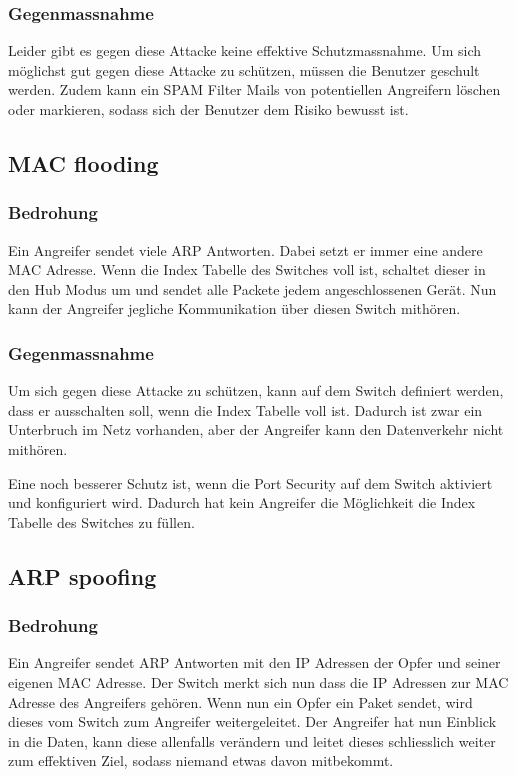 \documentclass[11pt,a4paper,parskip=half]{scrartcl}
\begin{document}
\subsubsection{Gegenmassnahme}
Leider gibt es gegen diese Attacke keine effektive Schutzmassnahme. Um sich möglichst gut gegen diese Attacke zu schützen, müssen die Benutzer geschult werden. Zudem kann ein SPAM Filter Mails von potentiellen Angreifern löschen oder markieren, sodass sich der Benutzer dem Risiko bewusst ist.

\subsection{MAC flooding}
\subsubsection{Bedrohung}
Ein Angreifer sendet viele ARP Antworten. Dabei setzt er immer eine andere MAC Adresse. Wenn die Index Tabelle des Switches voll ist, schaltet dieser in den Hub Modus um und sendet alle Packete jedem angeschlossenen Gerät. Nun kann der Angreifer jegliche Kommunikation über diesen Switch mithören. 
\subsubsection{Gegenmassnahme}
Um sich gegen diese Attacke zu schützen, kann auf dem Switch definiert werden, dass er ausschalten soll, wenn die Index Tabelle voll ist. Dadurch ist zwar ein Unterbruch im Netz vorhanden, aber der Angreifer kann den Datenverkehr nicht mithören.

Eine noch besserer Schutz ist, wenn die Port Security auf dem Switch aktiviert und konfiguriert wird. Dadurch hat kein Angreifer die Möglichkeit die Index Tabelle des Switches zu füllen.

\subsection{ARP spoofing}
\subsubsection{Bedrohung}
Ein Angreifer sendet ARP Antworten mit den IP Adressen der Opfer und seiner eigenen MAC Adresse. Der Switch merkt sich nun dass die IP Adressen zur MAC Adresse des Angreifers gehören. Wenn nun ein Opfer ein Paket sendet, wird dieses vom Switch zum Angreifer weitergeleitet. Der Angreifer hat nun Einblick in die Daten, kann diese allenfalls verändern und leitet dieses schliesslich weiter zum effektiven Ziel, sodass niemand etwas davon mitbekommt.
\end{document}
